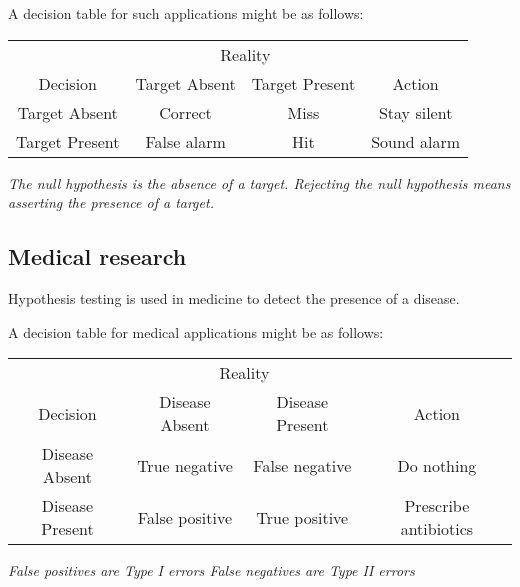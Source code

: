 \vspace*{2ex}
A decision table for such applications might be as follows:

\vspace*{2ex}
\begin{minipage}{\linewidth}\centering
\begin{tabular}{|c|c|c|c|} \hline
				& \multicolumn{2}{c|}{Reality} & \\
Decision		& 	Target Absent	& Target Present & Action\\  \hline
Target Absent	&	Correct		& Miss 			& Stay silent \\
Target Present&	False alarm 	& Hit 				& Sound alarm \\  \hline
\end{tabular}
\end{minipage}

\vspace*{2ex}
\bit
\it The null hypothesis is the \emph{absence} of a target.
\it Rejecting the null hypothesis means asserting the \emph{presence} of a target.
\eit


\subsection{Medical research}
Hypothesis testing is used in medicine to detect the presence of a disease. 

\vspace*{2ex}
A decision table for medical applications might be as follows:

\vspace*{2ex}
\begin{minipage}{\linewidth}\centering
\begin{tabular}{|c|c|c|c|} \hline
					& \multicolumn{2}{c|}{Reality} &  \\
Decision			& Disease Absent	& Disease Present		& Action \\  \hline
Disease Absent	& True negative	& False negative		& Do nothing  \\
Disease Present 	& False positive 	& True positive 		& Prescribe antibiotics \\  \hline
\end{tabular}
\end{minipage}

\vspace*{2ex}
\bit
\it False positives are Type I errors
\it False negatives are Type II errors
\eit


